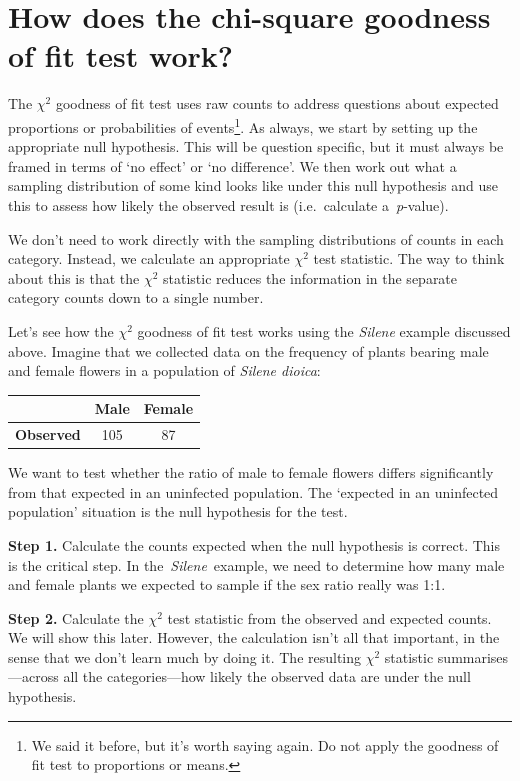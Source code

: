 \documentclass[
]{book}
\begin{document}
\hypertarget{how-does-the-chi-square-goodness-of-fit-test-work}{%
\section{How does the chi-square goodness of fit test work?}\label{how-does-the-chi-square-goodness-of-fit-test-work}}

The \(\chi^{2}\) goodness of fit test uses raw counts to address questions about expected proportions or probabilities of events\footnote{We said it before, but it's worth saying again. Do not apply the goodness of fit test to proportions or means.}. As always, we start by setting up the appropriate null hypothesis. This will be question specific, but it must always be framed in terms of `no effect' or `no difference'. We then work out what a sampling distribution of some kind looks like under this null hypothesis and use this to assess how likely the observed result is (i.e.~calculate a~\emph{p}-value).

We don't need to work directly with the sampling distributions of counts in each category. Instead, we calculate an appropriate \(\chi^{2}\) test statistic. The way to think about this is that the \(\chi^{2}\) statistic reduces the information in the separate category counts down to a single number.

Let's see how the \(\chi^{2}\) goodness of fit test works using the \emph{Silene} example discussed above. Imagine that we collected data on the frequency of plants bearing male and female flowers in a population of \emph{Silene dioica}:

\begin{longtable}[]{@{}lcc@{}}
\toprule()
& Male & Female \\
\midrule()
\endhead
\textbf{Observed} & 105 & 87 \\
\bottomrule()
\end{longtable}

We want to test whether the ratio of male to female flowers differs significantly from that expected in an uninfected population. The `expected in an uninfected population' situation is the null hypothesis for the test.

\textbf{Step 1.} Calculate the counts expected when the null hypothesis is correct. This is the critical step. In the~\emph{Silene}~example, we need to determine how many male and female plants we expected to sample if the sex ratio really was 1:1.

\textbf{Step 2.} Calculate the \(\chi^{2}\) test statistic from the observed and expected counts. We will show this later. However, the calculation isn't all that important, in the sense that we don't learn much by doing it. The resulting \(\chi^{2}\) statistic summarises---across all the categories---how likely the observed data are under the null hypothesis.
\end{document}
